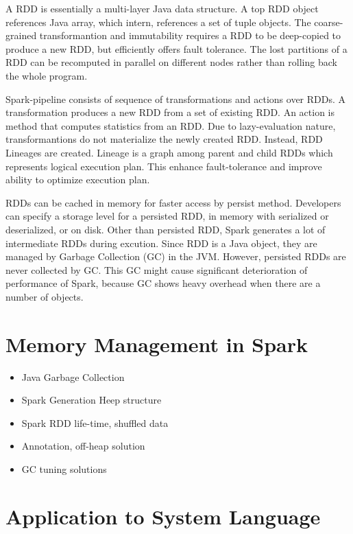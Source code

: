 A RDD is essentially a multi-layer Java data structure. A top RDD object references Java array, which intern, references a set of tuple objects. 
The coarse-grained transformantion and immutability requires a RDD to be deep-copied to produce a new RDD, but efficiently offers fault tolerance. 
The lost partitions of a RDD can be recomputed in parallel on different nodes rather than rolling back the whole program.

Spark-pipeline consists of sequence of transformations and actions over RDDs. A transformation produces a new RDD from a set of existing RDD. 
An action is method that computes statistics from an RDD. Due to lazy-evaluation nature, transformantions do not materialize the newly created RDD. 
Instead, RDD Lineages are created. Lineage is a graph among parent and child RDDs which represents logical execution plan. 
This enhance fault-tolerance and improve ability to optimize execution plan. 

RDDs can be cached in memory for faster access by persist method. Developers can specify a storage level for a persisted RDD, in memory with serialized or deserialized, or on disk. 
Other than persisted RDD, Spark generates a lot of intermediate RDDs during excution. Since RDD is a Java object, they are managed by Garbage Collection (GC) in the JVM. 
However, persisted RDDs are never collected by GC. This GC might cause significant deterioration of performance of Spark, because GC shows heavy overhead when there are a number of objects.


\section{Memory Management in Spark}
\label{sec:history}



\begin{itemize}
    \item Java Garbage Collection
    \item Spark Generation Heep structure
    \item Spark RDD life-time, shuffled data
    \item Annotation, off-heap solution 
    \item GC tuning solutions
\end{itemize}



\section{Application to System Language}
\label{sec:history}


